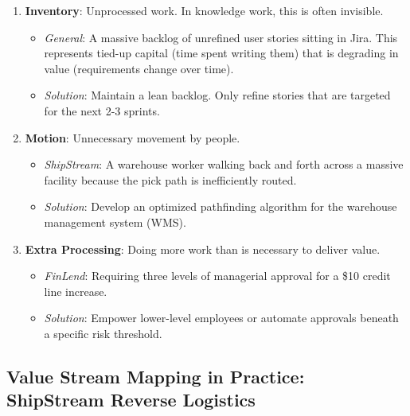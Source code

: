 \documentclass[
  11pt,
  openany,
  oneside]{book}
\providecommand{\tightlist}{%
  \setlength{\itemsep}{0pt}\setlength{\parskip}{0pt}}
\begin{document}
\begin{enumerate}
  \begin{itemize}
  \tightlist
  \item
    \emph{FinLend}: Moving customer data between legacy systems via
    insecure, manual flat-file SFTP transfers instead of real-time APIs.
  \item
    \emph{Solution}: Define API contracts to integrate systems
    seamlessly.
  \end{itemize}
\item
  \textbf{Inventory}: Unprocessed work. In knowledge work, this is often
  invisible.

  \begin{itemize}
  \tightlist
  \item
    \emph{General}: A massive backlog of unrefined user stories sitting
    in Jira. This represents tied-up capital (time spent writing them)
    that is degrading in value (requirements change over time).
  \item
    \emph{Solution}: Maintain a lean backlog. Only refine stories that
    are targeted for the next 2-3 sprints.
  \end{itemize}
\item
  \textbf{Motion}: Unnecessary movement by people.

  \begin{itemize}
  \tightlist
  \item
    \emph{ShipStream}: A warehouse worker walking back and forth across
    a massive facility because the pick path is inefficiently routed.
  \item
    \emph{Solution}: Develop an optimized pathfinding algorithm for the
    warehouse management system (WMS).
  \end{itemize}
\item
  \textbf{Extra Processing}: Doing more work than is necessary to
  deliver value.

  \begin{itemize}
  \tightlist
  \item
    \emph{FinLend}: Requiring three levels of managerial approval for a
    \$10 credit line increase.
  \item
    \emph{Solution}: Empower lower-level employees or automate approvals
    beneath a specific risk threshold.
  \end{itemize}
\end{enumerate}

\subsection{Value Stream Mapping in Practice: ShipStream Reverse
Logistics}\label{value-stream-mapping-in-practice-shipstream-reverse-logistics}
\end{document}
